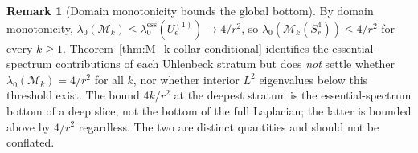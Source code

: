 \documentclass[11pt,letterpaper]{article}
\theoremstyle{definition}
\newtheorem{remark}[theorem]{Remark}
\newcommand{\cM}{\mathcal{M}}
\begin{document}
\begin{remark}[Domain monotonicity bounds the global bottom]\label{rmk:not-global-bottom}
By domain monotonicity, $\lambda_0(\cM_k) \le \lambda_0^{\mathrm{ess}}(U_\epsilon^{(1)}) \to 4/r^2$, so $\lambda_0(\cM_k(S^4_r)) \le 4/r^2$ for every $k \ge 1$. Theorem~\ref{thm:M_k-collar-conditional} identifies the essential-spectrum contributions of each Uhlenbeck stratum but does \emph{not} settle whether $\lambda_0(\cM_k) = 4/r^2$ for all $k$, nor whether interior $L^2$ eigenvalues below this threshold exist. The bound $4k/r^2$ at the deepest stratum is the essential-spectrum bottom of a deep slice, not the bottom of the full Laplacian; the latter is bounded above by $4/r^2$ regardless. The two are distinct quantities and should not be conflated.
\end{remark}
\end{document}
